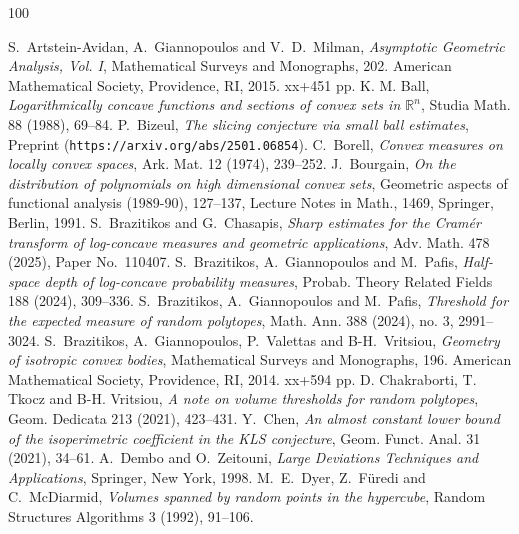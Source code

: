 \documentclass[11pt,leqno]{article}
\theoremstyle{definition}
\theoremstyle{remark}
\numberwithin{equation}{section}
\newcommand{\1}{\textbf{1}}
\begin{document}
\footnotesize

\begin{thebibliography}{100}
\footnotesize

 {\rm S.\ Artstein-Avidan, A.\ Giannopoulos and V.\ D.\ Milman}, \textit{Asymptotic Geometric Analysis,
Vol. I}, Mathematical Surveys and Monographs, 202. American Mathematical Society, Providence, RI, 2015. xx+451 pp.
 {\rm K. M. Ball}, \textit{Logarithmically concave functions and sections of convex sets in ${\mathbb R}^n$},
Studia Math. {88} (1988), 69--84.
 \textrm{P.\ Bizeul}, \textit{The slicing conjecture via small ball estimates},
Preprint ({\tt https://arxiv.org/abs/2501.06854}).
 {\rm C.\ Borell}, \textit{Convex measures on locally convex spaces},
Ark. Mat. {12} (1974), 239--252.
 {\rm J.\ Bourgain}, \textit{On the distribution of polynomials on high dimensional convex sets},
Geometric aspects of functional analysis (1989-90), 127--137, Lecture Notes in Math., 1469, Springer, Berlin, 1991.
 {\rm S.\ Brazitikos and G.\ Chasapis}, \textit{Sharp estimates for the Cram\'{e}r transform
of  log-concave  measures and  geometric  applications},  Adv. Math. 478 (2025), Paper No.~110407.
 {\rm S.\ Brazitikos, A.\ Giannopoulos and M.\ Pafis}, \textit{Half-space depth of log-concave probability measures},
Probab. Theory Related Fields  {188} (2024),  309--336.
 {\rm S.\ Brazitikos, A.\ Giannopoulos and M.\ Pafis}, \textit{Threshold for the expected measure
of random polytopes}, Math. Ann. {388} (2024), no. 3, 2991--3024.
 {\rm S.\ Brazitikos, A.\ Giannopoulos, P.\ Valettas and B-H.\ Vritsiou}, \textit{Geometry of isotropic
convex bodies}, Mathematical Surveys and Monographs, 196. American Mathematical Society, Providence, RI, 2014. xx+594 pp.
 {\rm D. Chakraborti, T. Tkocz and B-H. Vritsiou},
\textit{A note on volume thresholds for random polytopes}, Geom. Dedicata {213} (2021), 423--431.
 {Y.~Chen,} \textit{An almost constant lower bound of the isoperimetric coefficient in the KLS conjecture},
Geom. Funct. Anal. {31} (2021), 34--61.
 {A.\ Dembo and O.\ Zeitouni}, \textit{Large Deviations Techniques and Applications},
Springer, New York, 1998.
 {\rm M.\ E.\ Dyer, Z.\ F\"{u}redi and C.\ McDiarmid}, \textit{Volumes spanned by random points in the hypercube},
{Random Structures Algorithms} {3} (1992), 91--106.

\end{thebibliography}
\end{document}
